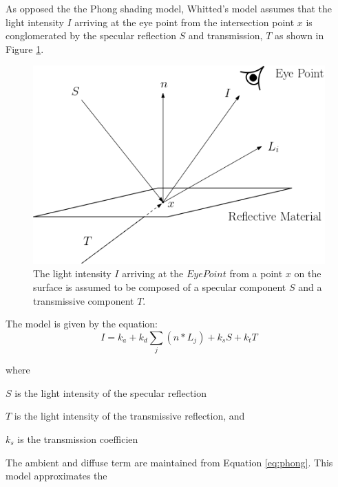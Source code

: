 As opposed the the Phong shading model, Whitted's model assumes that the light intensity $I$ arriving at the eye point from the intersection point $x$ is conglomerated by the specular reflection $S$ and transmission, $T$ as shown in Figure \ref{fig:whitted_model}.

\begin{figure}[h]
	\centering
	\includegraphics[width=.7\linewidth]{img/1 fundamentals/whitted.png}
	\caption{The light intensity $I$ arriving at the $Eye Point$ from a point $x$ on the surface is assumed to be composed of a specular component $S$ and a transmissive component $T$.}
	\label{fig:whitted_model}
\end{figure}


The model is given by the equation:
\begin{equation}
I = k_{a} + k_{d}\sum_{j}(n*L_{j}) + k_{s}S + k_{t}T
\end{equation}

\noindent where
\begin{description}
	\setlength\itemsep{0.05em}
	\item  $S$ is the light intensity of the specular reflection
	\item  $T$ is the light intensity of the transmissive reflection, and
	\item  $k_{s}$ is the transmission coefficien
\end{description}

The ambient and diffuse term are maintained from Equation \ref{eq:phong}. 
This model approximates the 

